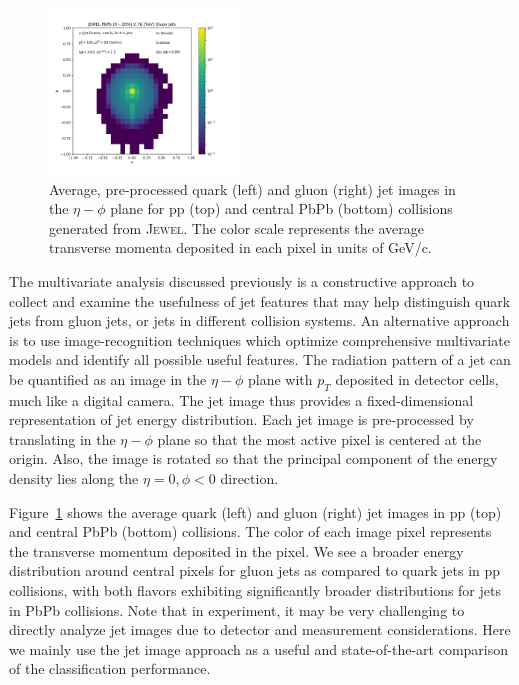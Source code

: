 \documentclass[notoc,preprintnumbers]{JHEP3}
\begin{document}
\begin{figure}[t]
\includegraphics[width=0.45\textwidth]{Fig3d}
\caption{Average, pre-processed quark (left) and gluon (right) jet images in the $\eta-\phi$ plane for pp (top) and central PbPb (bottom) collisions generated from \textsc{Jewel}. The color scale represents the average transverse momenta deposited in each pixel in units of GeV/c. }
\label{fig:qgjetimages}
\end{figure}

The multivariate analysis discussed previously is a constructive approach to collect and examine the usefulness of jet features that may help distinguish quark jets from gluon jets, or jets in different collision systems. An alternative approach is to use image-recognition techniques which optimize comprehensive multivariate models and identify all possible useful features. The radiation pattern of a jet can be quantified as an image in the $\eta-\phi$ plane with $p_T$ deposited in detector cells, much like a digital camera. The jet image thus provides a fixed-dimensional representation of jet energy distribution. Each jet image is pre-processed \cite{deOliveira:2015xxd} by translating in the $\eta-\phi$ plane so that the most active pixel is centered at the origin. Also, the image is rotated so that the principal component of the energy density lies along the $\eta=0, \phi<0$ direction.

Figure~\ref{fig:qgjetimages} shows the average quark (left) and gluon (right) jet images in pp (top) and central PbPb (bottom) collisions. The color of each image pixel represents the transverse momentum deposited in the pixel. We see a broader energy distribution around central pixels for gluon jets as compared to quark jets in pp collisions, with both flavors exhibiting significantly broader distributions for jets in PbPb collisions. Note that in experiment, it may be very challenging to directly analyze jet images due to detector and measurement considerations. Here we mainly use the jet image approach as a useful and state-of-the-art comparison of the classification performance.
	
\end{document}
